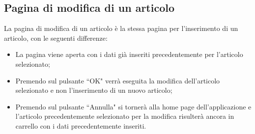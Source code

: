 \newpage

\subsection{Pagina di modifica di un articolo}

La pagina di modifica di un articolo è la stessa pagina per l'inserimento di un articolo, con le seguenti differenze:
\begin{itemize}
	\item La pagina viene aperta con i dati già inseriti precedentemente per l'articolo selezionato;
	\item Premendo sul pulsante ``OK" verrà eseguita la modifica dell'articolo selezionato e non l'inserimento di un nuovo articolo;
	\item Premendo sul pulsante ``Annulla" si tornerà alla home page dell'applicazione e l'articolo precedentemente selezionato per la modifica
	risulterà ancora in carrello con i dati precedentemente inseriti.
\end{itemize}





